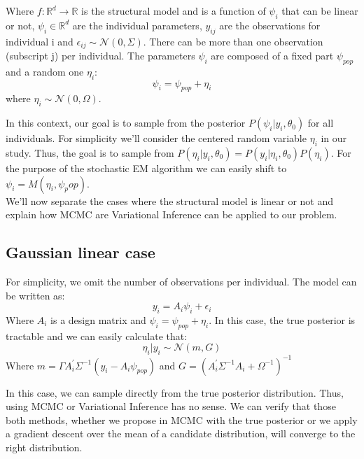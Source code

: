 \documentclass{article}
\begin{document}
Where $f: \mathbb{R}^d \to \mathbb{R}$ is the structural model and is a function of $\psi_i$ that can be linear or not, $\psi_i \in \mathbb{R}^d$ are the individual parameters, $y_{ij}$ are the observations for individual i and $\epsilon_{ij} \sim \mathcal{N}(0,\Sigma)$. There can be more than one observation (subscript j) per individual. The parameters $\psi_i$ are composed of a fixed part $\psi_{pop}$ and a random one $\eta_i$:
\begin{equation}
\psi_i = \psi_{pop} + \eta_i 
\end{equation}
where $\eta_i \sim \mathcal{N}(0,\Omega)$.

In this context, our goal is to sample from the posterior $P(\psi_i|y_i,\theta_0)$ for all individuals. For simplicity we'll consider the centered random variable $\eta_i$ in our study. Thus, the goal is to sample from $P(\eta_i|y_i,\theta_0) = P(y_i|\eta_i,\theta_0)P(\eta_i)$. For the purpose of the stochastic EM algorithm we can easily shift to $\psi_i = M(\eta_i, \psi_pop)$.\\
We'll now separate the cases where the structural model is linear or not and explain how MCMC are Variational Inference can be applied to our problem.

\subsection{Gaussian linear case}
For simplicity, we omit the number of observations per individual. The model can be written as:
\begin{equation}
y_{i} = A_i \psi_i + \epsilon_{i} 
\end{equation}
Where $A_i$ is a design matrix and $\psi_i = \psi_{pop} + \eta_i$. In this case, the true posterior is tractable and we can easily calculate that:
\begin{equation}
\eta_i|y_i \sim \mathcal{N}(m,G)
\end{equation}
Where $m = \Gamma A_i^\prime \Sigma^{-1} (y_i - A_i\psi_{pop})$ and $G = (A_i^\prime\Sigma^{-1}A_i + \Omega^{-1})^{-1}$

In this case, we can sample directly from the true posterior distribution. Thus, using MCMC or Variational Inference has no sense. We can verify that those both methods, whether we propose in MCMC with the true posterior or we apply a gradient descent over the mean of a candidate distribution, will converge to the right distribution.
\end{document}
